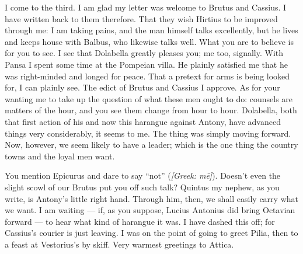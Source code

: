  I come to the third. I am glad my letter was welcome to Brutus and Cassius. I have written back to them therefore. That they wish Hirtius to be improved through me: I am taking pains, and the man himself talks excellently, but he lives and keeps house with Balbus, who likewise talks well. What you are to believe is for you to see. I see that Dolabella greatly pleases you; me too, signally. With Pansa I spent some time at the Pompeian villa. He plainly satisfied me that he was right-minded and longed for peace. That a pretext for arms is being looked for, I can plainly see. The edict of Brutus and Cassius I approve. As for your wanting me to take up the question of what these men ought to do: counsels are matters of the hour, and you see them change from hour to hour. Dolabella, both that first action of his and now this harangue against Antony, have advanced things very considerably, it seems to me. The thing was simply moving forward. Now, however, we seem likely to have a leader; which is the one thing the country towns and the loyal men want.

 You mention Epicurus and dare to say ``not'' (\textit{[Greek: m\=e]}). Doesn't even the slight scowl of our Brutus put you off such talk? Quintus my nephew, as you write, is Antony's little right hand. Through him, then, we shall easily carry what we want. I am waiting --- if, as you suppose, Lucius Antonius did bring Octavian forward --- to hear what kind of harangue it was. I have dashed this off; for Cassius's courier is just leaving. I was on the point of going to greet Pilia, then to a feast at Vestorius's by skiff. Very warmest greetings to Attica.
